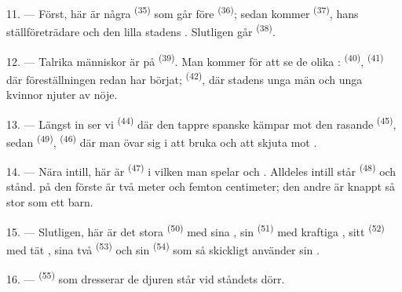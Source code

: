 11. --- Först, här är några  \textsuperscript{(35)} som går före
 \textsuperscript{(36)}; sedan kommer
 \textsuperscript{(37)}, hans ställföreträdare och den
lilla stadens . Slutligen går 
\textsuperscript{(38)}.

\VUsaut{5.0mm}
\VUsaut{3.6mm}

12. --- Talrika människor är på  \textsuperscript{(39)}. Man kommer
för att se de olika :  \textsuperscript{(40)},
 \textsuperscript{(41)} där föreställningen redan har börjat;
 \textsuperscript{(42)}, där stadens unga män och unga kvinnor
njuter av
 nöje.

13. --- Längst in ser vi  \textsuperscript{(44)} där den tappre spanske
 kämpar mot den rasande  \textsuperscript{(45)}, sedan
 \textsuperscript{(49)},
 \textsuperscript{(46)} där man övar sig i att bruka
 och att skjuta mot .

14. --- Nära intill, här är  \textsuperscript{(47)} i vilken man
spelar  och . Alldeles intill står
 \textsuperscript{(48)} och  stånd.
 på den förste är två meter och femton centimeter; den andre är
knappt så stor som ett barn.

15. --- Slutligen, här är det stora  \textsuperscript{(50)} med sina
, sin  \textsuperscript{(51)} med kraftiga ,
sitt  \textsuperscript{(52)} med tät
, sina två  \textsuperscript{(53)} och sin
 \textsuperscript{(54)} som så skickligt använder sin
.

16. ---  \textsuperscript{(55)} som dresserar de djuren står vid ståndets
dörr.
\VUsaut{6.0mm}
\VUfilet{22mm}
